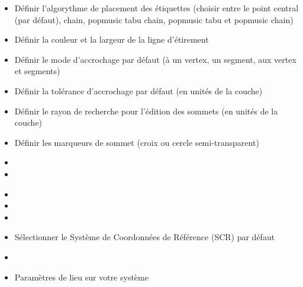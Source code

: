 
\begin{itemize}[label=--]
\item Définir l'algorythme de placement des étiquettes (choisir entre le point central (par défaut), chain, popmusic tabu chain, popmusic tabu et popmusic chain)
\end{itemize}


\begin{itemize}[label=--]
\item Définir la couleur et la largeur de la ligne d'étirement
\item Définir le mode d'accrochage par défaut (à un vertex, un segment, aux vertex et segments)
\item Définir la tolérance d'accrochage par défaut (en unités de la couche) 
\item Définir le rayon de recherche pour l'édition des sommets (en unités de la couche)
\item Définir les marqueurs de sommet (croix ou cercle semi-transparent)
\item {}
\item {}
\end{itemize}


\begin{itemize}[label=--]
\item {}
\item {}
\item {}
\item Sélectionner le Système de Coordonnées de Référence (SCR) par défaut
\end{itemize}


\begin{itemize}[label=--]
\item {}
\item Paramètres de lieu sur votre système
\end{itemize}

